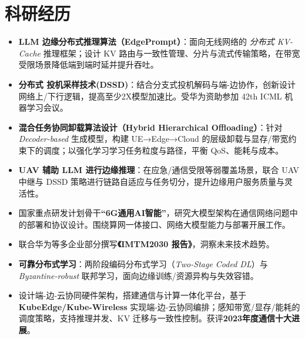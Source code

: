 \documentclass{resume}
\begin{document}
\section{科研经历}
\begin{itemize}[parsep=0.5ex]
  \item \textbf{LLM 边缘分布式推理算法（EdgePrompt）}：面向无线网络的 \textit{分布式 KV-Cache} 推理框架；设计 KV 路由与一致性管理、分片与流式传输策略，在带宽受限场景降低端到端时延并提升吞吐。
  \item \textbf{分布式 投机采样技术(DSSD)}：结合分支式投机解码与端-边协作，创新设计网络上/下行逻辑，提高至少2X模型加速比。受华为资助参加 42th ICML 机器学习会议。
  \item \textbf{混合任务协同卸载算法设计（Hybrid Hierarchical Offloading）}：针对 \textit{Decoder-based} 生成模型，构建 UE→Edge→Cloud 的层级卸载与显存/带宽约束下的调度；以强化学习学习任务粒度与路径，平衡 QoS、能耗与成本。
  \item \textbf{UAV 辅助 LLM 进行边缘推理}：在应急/通信受限等弱覆盖场景，联合 UAV 中继与 DSSD 策略进行链路自适应与任务切分，提升边缘用户服务质量与灵活性。
\end{itemize}

\begin{itemize}[parsep=0.5ex]
  \item 国家重点研发计划骨干\textbf{“6G通用AI智能”}，研究大模型架构在通信网络问题中的部署和协议设计。围绕算网一体接口、网络大模型能力与部署开展工作。
  \item 联合华为等多企业部分撰写\textbf{《IMTM2030 报告》}，洞察未来技术趋势。
  \item \textbf{可靠分布式学习}：两阶段编码分布式学习（\textit{Two-Stage Coded DL}）与 \textit{Byzantine-robust} 联邦学习，面向边缘训练/资源异构与失效容错。
  \item 设计端-边-云协同硬件架构，搭建通信与计算一体化平台，基于 \textbf{KubeEdge/Kube-Wireless} 实现端-边-云协同编排；感知带宽/显存/能耗的调度策略，支持推理并发、KV 迁移与一致性控制。获评\textbf{2023年度通信十大进展}。
\end{itemize}
\end{document}
